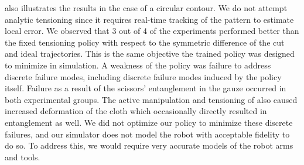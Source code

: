  also illustrates the results in the case of a circular contour. We do not attempt analytic tensioning since it requires real-time tracking of the pattern to estimate local error. We observed that 3 out of 4 of the \tpsalgo experiments performed better than the fixed tensioning policy with respect to the symmetric difference of the cut and ideal trajectories. This is the same objective the trained policy was designed to minimize in simulation. A weakness of the policy was failure to address discrete failure modes, including discrete failure modes induced by the policy itself. Failure as a result of the scissors' entanglement in the gauze occurred in both experimental groups. The active manipulation and tensioning of \tpsalgo also caused increased deformation of the cloth which occasionally directly resulted in entanglement as well. We did not optimize our policy to minimize these discrete failures, and our simulator does not model the robot with acceptable fidelity to do so. To address this, we would require very accurate models of the robot arms and tools.


